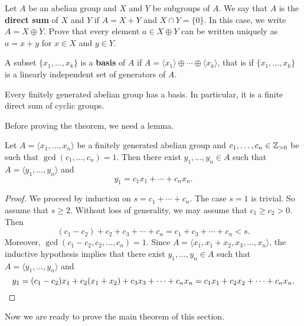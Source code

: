 \begin{exercise}
    Let $A$ be an abelian group and $X$ and $Y$ be subgroups of $A$. 
    We say that $A$ is the \textbf{direct sum} of $X$ and $Y$ 
    if $A=X+Y$ and $X\cap Y=\{0\}$. In this case, we write $A=X\oplus Y$. Prove that 
    every element $a\in X\oplus Y$ can be
    written uniquely as $a=x+y$ for $x\in X$ and $y\in Y$.     
\end{exercise}

A subset $\{x_1,\dots,x_k\}$ is a \textbf{basis} of $A$ 
if $A=\langle x_1\rangle\oplus\cdots\oplus \langle x_k\rangle$, that is
if $\{x_1,\dots,x_k\}$ is a 
linearly independent set of generators of $A$. 


\begin{theorem}
\label{thm:fundamental_abelian}
    Every finitely generated abelian group has a basis. In particular, 
    it is a finite direct sum of cyclic groups. 
\end{theorem}

Before proving the theorem, we need a lemma.

\begin{lemma}
\label{lem:trick_abelian}
    Let $A=\langle x_1,\dots,x_n\rangle$ be a finitely generated 
    abelian group and $c_1,\dots,c_n\in\mathbb{Z}_{>0}$ be such that 
    $\gcd(c_1,\dots,c_n)=1$. Then there exist $y_1,\dots,y_n\in A$ 
    such that 
    $A=\langle y_1,\dots,y_n\rangle$ and 
    \[ 
    y_1=c_1x_1+\cdots+c_nx_n.
    \]
\end{lemma}

\begin{proof}
    We proceed by induction on $s=c_1+\cdots+c_n$. The case $s=1$ is trivial. 
    So assume that $s\geq2$. Without loss of generality, we may assume that 
    $c_1\geq c_2>0$. Then 
    \[ 
    (c_1-c_2)+c_2+c_3+\cdots+c_n=c_1+c_3+\cdots+c_n<s.
    \]
    Moreover, $\gcd(c_1-c_2,c_2,\dots,c_n)=1$. Since $A=\langle x_1,x_1+x_2,x_3,\dots,x_n\rangle$, the inductive hypothesis implies that 
    there exist $y_1,\dots,y_n\in A$ such that 
    $A=\langle y_1,\dots,y_n\rangle$ and 
    \[ 
        y_1=(c_1-c_2)x_1+c_2(x_1+x_2)+c_3x_3+\cdots+c_nx_n
        =c_1x_1+c_2x_2+\cdots+c_nx_n.\qedhere
    \]
\end{proof}

Now we are ready to prove the main theorem of this section. 

